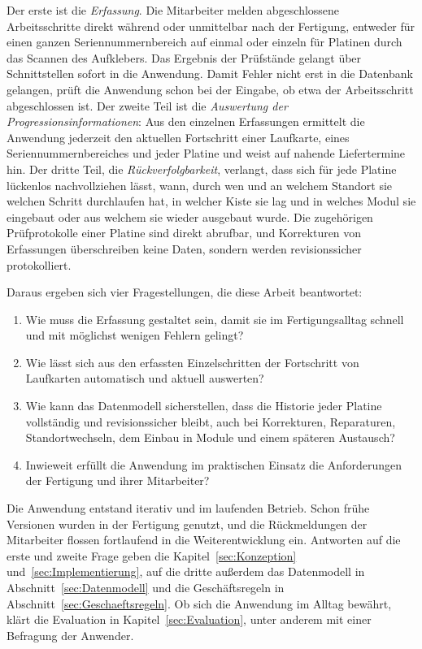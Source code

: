Der erste ist die \emph{Erfassung}. Die Mitarbeiter melden abgeschlossene
Arbeitsschritte direkt während oder unmittelbar nach der Fertigung, entweder für einen ganzen
Seriennummernbereich auf einmal oder einzeln für Platinen durch das Scannen des Aufklebers. 
Das Ergebnis der Prüfstände gelangt über Schnittstellen
sofort in die Anwendung. Damit Fehler nicht erst in die Datenbank
gelangen, prüft die Anwendung schon bei der Eingabe, ob etwa der
Arbeitsschritt abgeschlossen ist. Der zweite Teil ist die \emph{Auswertung der
Progressionsinformationen}: Aus den einzelnen Erfassungen ermittelt die
Anwendung jederzeit den aktuellen Fortschritt einer Laufkarte, eines
Seriennummernbereiches und jeder Platine und weist auf nahende Liefertermine hin.
Der dritte Teil, die \emph{Rückverfolgbarkeit}, verlangt, dass sich für jede
Platine lückenlos nachvollziehen lässt, wann, durch wen und an welchem Standort
sie welchen Schritt durchlaufen hat, in welcher Kiste sie lag und in welches
Modul sie eingebaut oder aus welchem sie wieder ausgebaut wurde. Die
zugehörigen Prüfprotokolle einer Platine sind direkt abrufbar, und Korrekturen von Erfassungen überschreiben
keine Daten, sondern werden revisionssicher protokolliert.

Daraus ergeben sich vier Fragestellungen, die diese Arbeit beantwortet:

\begin{enumerate}
	\item Wie muss die Erfassung gestaltet sein, damit sie im Fertigungsalltag
	schnell und mit möglichst wenigen Fehlern gelingt?
	\item Wie lässt sich aus den erfassten Einzelschritten der Fortschritt von
	Laufkarten automatisch und aktuell auswerten?
	\item Wie kann das Datenmodell sicherstellen, dass die Historie jeder
	Platine vollständig und revisionssicher bleibt, auch bei Korrekturen,
	Reparaturen, Standortwechseln, dem Einbau in Module und einem späteren
	Austausch?
	\item Inwieweit erfüllt die Anwendung im praktischen Einsatz die
	Anforderungen der Fertigung und ihrer Mitarbeiter?
\end{enumerate}

Die Anwendung entstand iterativ und im laufenden Betrieb. Schon frühe
Versionen wurden in der Fertigung genutzt, und die Rückmeldungen der
Mitarbeiter flossen fortlaufend in die Weiterentwicklung ein. Antworten auf die
erste und zweite Frage geben die Kapitel~\ref{sec:Konzeption}
und~\ref{sec:Implementierung}, auf die dritte außerdem das Datenmodell in
Abschnitt~\ref{sec:Datenmodell} und die Geschäftsregeln in
Abschnitt~\ref{sec:Geschaeftsregeln}. Ob sich die Anwendung im Alltag bewährt, klärt die Evaluation
in Kapitel~\ref{sec:Evaluation}, unter anderem mit einer Befragung der Anwender.

